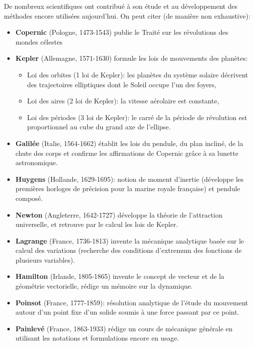 \documentclass[12pt]{article}
\begin{document}
De nombreux scientifiques ont contribué à son étude et au développement des méthodes encore utilisées aujourd'hui. On peut citer (de manière non exhaustive):
\begin{itemize}
\item \textbf{Copernic} (Pologne, 1473-1543) publie le \og{}Traité sur les révolutions des mondes célestes\fg{}
\item \textbf{Kepler} (Allemagne, 1571-1630) formule les lois de mouvements des planètes:
\begin{itemize}
\item Loi des orbites (1\iere \; loi de Kepler): les planètes du système solaire décrivent des trajectoires elliptiques dont le Soleil occupe l'un des foyers,
\item Loi des aires (2\ieme \; loi de Kepler): la vitesse aérolaire est constante,
\item Loi des périodes (3\ieme \; loi de Kepler): le carré de la période de révolution est proportionnel au cube du grand axe de l'ellipse.
\end{itemize}
\item \textbf{Galilée} (Italie, 1564-1662) établit les lois du pendule, du plan incliné, de la chute des corps et confirme les affirmations de Copernic grâce à sa lunette astronomique.
\item \textbf{Huygens} (Hollande, 1629-1695): notion de moment d'inertie (développe les premières horloges de précision pour la marine royale française) et pendule composé.
\item \textbf{Newton} (Angleterre, 1642-1727) développe la théorie de l'attraction universelle, et retrouve par le calcul les lois de Kepler.
\item \textbf{Lagrange} (France, 1736-1813) invente la mécanique analytique basée sur le calcul des variations (recherche des conditions d'extremum des fonctions de plusieurs variables).
\item \textbf{Hamilton} (Irlande, 1805-1865) invente le concept de vecteur et de la géométrie vectorielle, rédige un mémoire sur la dynamique.
\item \textbf{Poinsot} (France, 1777-1859): résolution analytique de l'étude du mouvement autour d'un point fixe d'un solide soumis à une force passant par ce point.
\item \textbf{Painlevé} (France, 1863-1933) rédige un cours de mécanique générale en utilisant les notations et formulations encore en usage.
\end{itemize}
\end{document}
